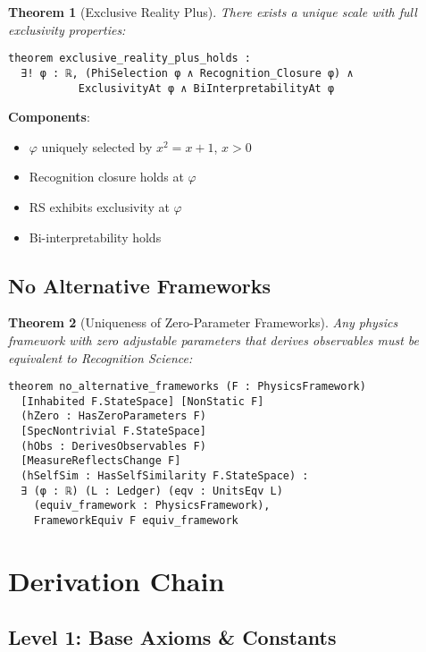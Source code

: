 \documentclass[11pt]{article}
\newtheorem{theorem}{Theorem}[section]
\theoremstyle{definition}
\theoremstyle{remark}
\begin{document}
\begin{theorem}[Exclusive Reality Plus]
\label{thm:exclusive-reality}
There exists a unique scale with full exclusivity properties:
\begin{lstlisting}[language=lean]
theorem exclusive_reality_plus_holds :
  ∃! φ : ℝ, (PhiSelection φ ∧ Recognition_Closure φ) ∧
           ExclusivityAt φ ∧ BiInterpretabilityAt φ
\end{lstlisting}
\end{theorem}

\textbf{Components}:
\begin{itemize}
\item $\varphi$ uniquely selected by $x^2 = x + 1$, $x > 0$
\item Recognition closure holds at $\varphi$
\item RS exhibits exclusivity at $\varphi$
\item Bi-interpretability holds
\end{itemize}

\subsection{No Alternative Frameworks}

\begin{theorem}[Uniqueness of Zero-Parameter Frameworks]
\label{thm:no-alternatives}
Any physics framework with zero adjustable parameters that derives observables must be equivalent to Recognition Science:
\begin{lstlisting}[language=lean]
theorem no_alternative_frameworks (F : PhysicsFramework)
  [Inhabited F.StateSpace] [NonStatic F]
  (hZero : HasZeroParameters F)
  [SpecNontrivial F.StateSpace]
  (hObs : DerivesObservables F)
  [MeasureReflectsChange F]
  (hSelfSim : HasSelfSimilarity F.StateSpace) :
  ∃ (φ : ℝ) (L : Ledger) (eqv : UnitsEqv L)
    (equiv_framework : PhysicsFramework),
    FrameworkEquiv F equiv_framework
\end{lstlisting}
\end{theorem}

\section{Derivation Chain}

\subsection{Level 1: Base Axioms \& Constants}
\end{document}
